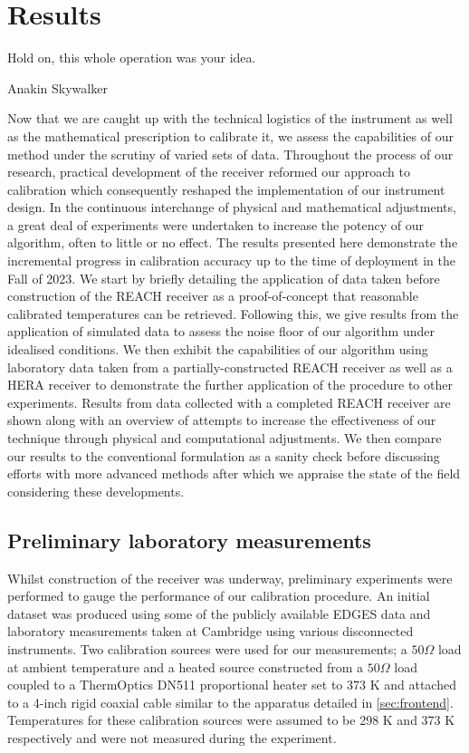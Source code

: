 \chapter{Results}\label{chap:results}

\ifpdf
    \graphicspath{{results/figs/Raster/}{results/figs/PDF/}{results/figs/}}
\else
    \graphicspath{{results/figs/Vector/}{results/figs/}}
\fi

\epigraph{Hold on, this whole operation was your idea.}{Anakin Skywalker}

Now that we are caught up with the technical logistics of the instrument as well as the mathematical prescription to calibrate it, we assess the capabilities of our method under the scrutiny of varied sets of data. Throughout the process of our research, practical development of the receiver reformed our approach to calibration which consequently reshaped the implementation of our instrument design. In the continuous interchange of physical and mathematical adjustments, a great deal of experiments were undertaken to increase the potency of our algorithm, often to little or no effect. The results presented here demonstrate the incremental progress in calibration accuracy up to the time of deployment in the Fall of 2023. We start by briefly detailing the application of data taken before construction of the REACH receiver as a proof-of-concept that reasonable calibrated temperatures can be retrieved. Following this, we give results from the application of simulated data to assess the noise floor of our algorithm under idealised conditions. We then exhibit the capabilities of our algorithm using laboratory data taken from a partially-constructed REACH receiver as well as a HERA receiver to demonstrate the further application of the procedure to other experiments. Results from data collected with a completed REACH receiver are shown along with an overview of attempts to increase the effectiveness of our technique through physical and computational adjustments. We then compare our results to the conventional formulation as a sanity check before discussing efforts with more advanced methods after which we appraise the state of the field considering these developments.


\section{Preliminary laboratory measurements}\label{sec:mphil_results}
Whilst construction of the receiver was underway, preliminary experiments were performed to gauge the performance of our calibration procedure. An initial dataset was produced using some of the publicly available EDGES data and laboratory measurements taken at Cambridge using various disconnected instruments. Two calibration sources were used for our measurements; a $50 \Omega$ load at ambient temperature and a heated source constructed from a $50 \Omega$ load coupled to a ThermOptics DN511 proportional heater set to 373 K and attached to a 4-inch rigid coaxial cable similar to the apparatus detailed in \cref{sec:frontend}. Temperatures for these calibration sources were assumed to be 298 K and 373 K respectively and were not measured during the experiment.

